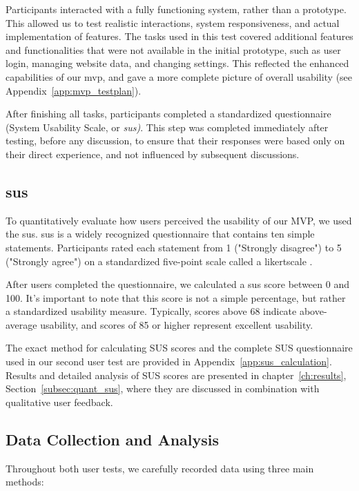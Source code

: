 Participants interacted with a fully functioning system, rather than a prototype. This allowed us to test realistic interactions, system responsiveness, and actual implementation of features. The tasks used in this test covered additional features and functionalities that were not available in the initial prototype, such as user login, managing website data, and changing settings. This reflected the enhanced capabilities of our \acrshort{mvp}, and gave a more complete picture of overall usability (see Appendix~\ref{app:mvp_testplan}).

After finishing all tasks, participants completed a standardized questionnaire (System Usability Scale, or \textit{\acrshort{sus})}. This step was completed immediately after testing, before any discussion, to ensure that their responses were based only on their direct experience, and not influenced by subsequent discussions.

\subsection{\acrlong{sus}}
\label{subsec:sus}
To quantitatively evaluate how users perceived the usability of our MVP, we used the \acrfull{sus}. \acrshort{sus} is a widely recognized questionnaire that contains ten simple statements. Participants rated each statement from 1 ("Strongly disagree") to 5 ("Strongly agree") on a standardized five-point scale called a \gls{likertscale} \autocite{MeasuringSUS2011}.

After users completed the questionnaire, we calculated a \acrshort{sus} score between 0 and 100. It’s important to note that this score is not a simple percentage, but rather a standardized usability measure. Typically, scores above 68 indicate above-average usability, and scores of 85 or higher represent excellent usability.

The exact method for calculating SUS scores and the complete SUS questionnaire used in our second user test are provided in Appendix~\ref{app:sus_calculation}. Results and detailed analysis of SUS scores are presented in chapter~\ref{ch:results}, Section~\ref{subsec:quant_sus}, where they are discussed in combination with qualitative user feedback.

\subsection{Data Collection and Analysis}
Throughout both user tests, we carefully recorded data using three main methods:

